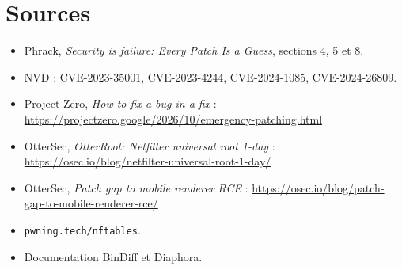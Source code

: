 \documentclass{training}
\begin{document}
\chapter{Sources}
\begin{itemize}
  \item Phrack, \emph{Security is failure: Every Patch Is a Guess},
        sections 4, 5 et 8.
  \item NVD : CVE-2023-35001, CVE-2023-4244, CVE-2024-1085,
        CVE-2024-26809.
  \item Project Zero, \emph{How to fix a bug in a fix} :
        \url{https://projectzero.google/2026/10/emergency-patching.html}
  \item OtterSec, \emph{OtterRoot: Netfilter universal root 1-day} :
        \url{https://osec.io/blog/netfilter-universal-root-1-day/}
  \item OtterSec, \emph{Patch gap to mobile renderer RCE} :
        \url{https://osec.io/blog/patch-gap-to-mobile-renderer-rce/}
  \item \texttt{pwning.tech/nftables}.
  \item Documentation BinDiff et Diaphora.
\end{itemize}

\end{document}
